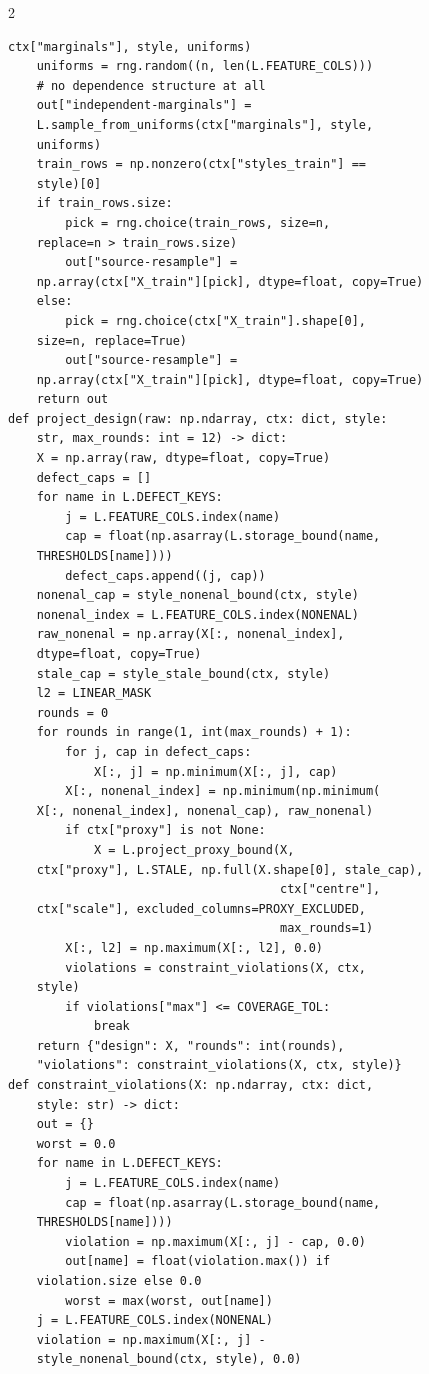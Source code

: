 \begin{multicols}{2}
\begin{Verbatim}[fontsize=\scriptsize]
    ctx["marginals"], style, uniforms)
    uniforms = rng.random((n, len(L.FEATURE_COLS)))
    # no dependence structure at all
    out["independent-marginals"] =
    L.sample_from_uniforms(ctx["marginals"], style,
    uniforms)
    train_rows = np.nonzero(ctx["styles_train"] ==
    style)[0]
    if train_rows.size:
        pick = rng.choice(train_rows, size=n,
    replace=n > train_rows.size)
        out["source-resample"] =
    np.array(ctx["X_train"][pick], dtype=float, copy=True)
    else:
        pick = rng.choice(ctx["X_train"].shape[0],
    size=n, replace=True)
        out["source-resample"] =
    np.array(ctx["X_train"][pick], dtype=float, copy=True)
    return out
def project_design(raw: np.ndarray, ctx: dict, style:
    str, max_rounds: int = 12) -> dict:
    X = np.array(raw, dtype=float, copy=True)
    defect_caps = []
    for name in L.DEFECT_KEYS:
        j = L.FEATURE_COLS.index(name)
        cap = float(np.asarray(L.storage_bound(name,
    THRESHOLDS[name])))
        defect_caps.append((j, cap))
    nonenal_cap = style_nonenal_bound(ctx, style)
    nonenal_index = L.FEATURE_COLS.index(NONENAL)
    raw_nonenal = np.array(X[:, nonenal_index],
    dtype=float, copy=True)
    stale_cap = style_stale_bound(ctx, style)
    l2 = LINEAR_MASK
    rounds = 0
    for rounds in range(1, int(max_rounds) + 1):
        for j, cap in defect_caps:
            X[:, j] = np.minimum(X[:, j], cap)
        X[:, nonenal_index] = np.minimum(np.minimum(
    X[:, nonenal_index], nonenal_cap), raw_nonenal)
        if ctx["proxy"] is not None:
            X = L.project_proxy_bound(X,
    ctx["proxy"], L.STALE, np.full(X.shape[0], stale_cap),
                                      ctx["centre"],
    ctx["scale"], excluded_columns=PROXY_EXCLUDED,
                                      max_rounds=1)
        X[:, l2] = np.maximum(X[:, l2], 0.0)
        violations = constraint_violations(X, ctx,
    style)
        if violations["max"] <= COVERAGE_TOL:
            break
    return {"design": X, "rounds": int(rounds),
    "violations": constraint_violations(X, ctx, style)}
def constraint_violations(X: np.ndarray, ctx: dict,
    style: str) -> dict:
    out = {}
    worst = 0.0
    for name in L.DEFECT_KEYS:
        j = L.FEATURE_COLS.index(name)
        cap = float(np.asarray(L.storage_bound(name,
    THRESHOLDS[name])))
        violation = np.maximum(X[:, j] - cap, 0.0)
        out[name] = float(violation.max()) if
    violation.size else 0.0
        worst = max(worst, out[name])
    j = L.FEATURE_COLS.index(NONENAL)
    violation = np.maximum(X[:, j] -
    style_nonenal_bound(ctx, style), 0.0)

\end{Verbatim}
\end{multicols}
